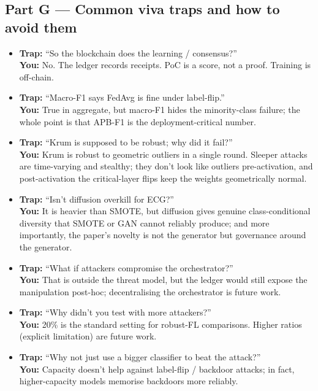 \documentclass[11pt,a4paper]{article}
\begin{document}
\subsection{Part G --- Common viva traps and how to avoid them}

\begin{itemize}
\item \textbf{Trap:} ``So the blockchain does the learning / consensus?''\\
\textbf{You:} No. The ledger records receipts. PoC is a score, not a proof. Training is off-chain.

\item \textbf{Trap:} ``Macro-F1 says FedAvg is fine under label-flip.''\\
\textbf{You:} True in aggregate, but macro-F1 hides the minority-class failure; the whole point is that APB-F1 is the deployment-critical number.

\item \textbf{Trap:} ``Krum is supposed to be robust; why did it fail?''\\
\textbf{You:} Krum is robust to geometric outliers in a single round. Sleeper attacks are time-varying and stealthy; they don't look like outliers pre-activation, and post-activation the critical-layer flips keep the weights geometrically normal.

\item \textbf{Trap:} ``Isn't diffusion overkill for ECG?''\\
\textbf{You:} It is heavier than SMOTE, but diffusion gives genuine class-conditional diversity that SMOTE or GAN cannot reliably produce; and more importantly, the paper's novelty is not the generator but governance around the generator.

\item \textbf{Trap:} ``What if attackers compromise the orchestrator?''\\
\textbf{You:} That is outside the threat model, but the ledger would still expose the manipulation post-hoc; decentralising the orchestrator is future work.

\item \textbf{Trap:} ``Why didn't you test with more attackers?''\\
\textbf{You:} 20\% is the standard setting for robust-FL comparisons. Higher ratios (explicit limitation) are future work.

\item \textbf{Trap:} ``Why not just use a bigger classifier to beat the attack?''\\
\textbf{You:} Capacity doesn't help against label-flip / backdoor attacks; in fact, higher-capacity models memorise backdoors more reliably.
\end{itemize}
\end{document}
